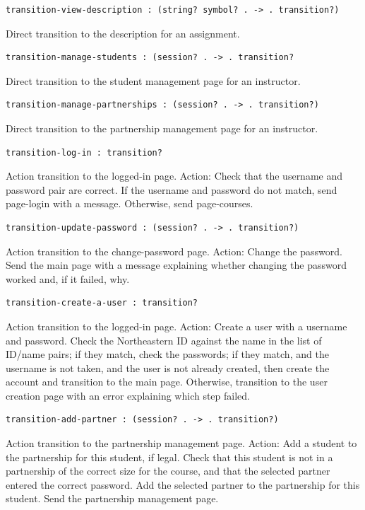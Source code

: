 \documentclass[a4paper]{article}
\begin{document}
\begin{verbatim}
transition-view-description : (string? symbol? . -> . transition?)
\end{verbatim}
Direct transition to the description for an assignment.

\begin{verbatim}
transition-manage-students : (session? . -> . transition?
\end{verbatim}
Direct transition to the student management page for an instructor.

\begin{verbatim}
transition-manage-partnerships : (session? . -> . transition?)
\end{verbatim}
Direct transition to the partnership management page for an instructor.

\begin{verbatim}
transition-log-in : transition?
\end{verbatim}
Action transition to the logged-in page.
Action: Check that the username and password pair are correct.
If the username and password do not match, send page-login with a message.
Otherwise, send page-courses.

\begin{verbatim}
transition-update-password : (session? . -> . transition?)
\end{verbatim}
Action transition to the change-password page.
Action: Change the password.
Send the main page with a message explaining whether changing the password
worked and, if it failed, why.

\begin{verbatim}
transition-create-a-user : transition?
\end{verbatim}
Action transition to the logged-in page.
Action: Create a user with a username and password.
Check the Northeastern ID against the name in the list of
ID/name pairs; if they match, check the passwords; if they
match, and the username is not taken, and the user is not
already created, then create the account and transition to
the main page. Otherwise, transition to the user
creation page with an error explaining which step failed.

\begin{verbatim}
transition-add-partner : (session? . -> . transition?)
\end{verbatim}
Action transition to the partnership management page.
Action: Add a student to the partnership for this student, if legal.
Check that this student is not in a partnership of the correct size for the
course, and that the selected partner entered the correct password. Add
the selected partner to the partnership for this student. Send the partnership
management page.
\end{document}
